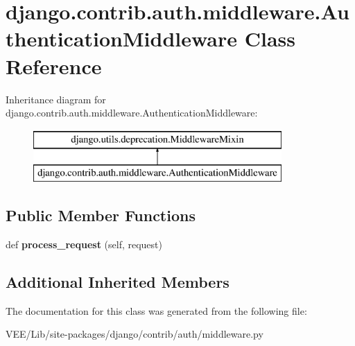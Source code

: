 \hypertarget{classdjango_1_1contrib_1_1auth_1_1middleware_1_1_authentication_middleware}{}\section{django.\+contrib.\+auth.\+middleware.\+Authentication\+Middleware Class Reference}
\label{classdjango_1_1contrib_1_1auth_1_1middleware_1_1_authentication_middleware}
Inheritance diagram for django.\+contrib.\+auth.\+middleware.\+Authentication\+Middleware\+:\begin{figure}[H]
\begin{center}
\leavevmode
\includegraphics[height=2.000000cm]{classdjango_1_1contrib_1_1auth_1_1middleware_1_1_authentication_middleware}
\end{center}
\end{figure}
\subsection*{Public Member Functions}
\begin{DoxyCompactItemize}
\item 
\mbox{\label{classdjango_1_1contrib_1_1auth_1_1middleware_1_1_authentication_middleware_af0999289e5540ef1e2c4b0185d7af288}} 
def {\bfseries process\+\_\+request} (self, request)
\end{DoxyCompactItemize}
\subsection*{Additional Inherited Members}


The documentation for this class was generated from the following file\+:\begin{DoxyCompactItemize}
\item 
V\+E\+E/\+Lib/site-\/packages/django/contrib/auth/middleware.\+py\end{DoxyCompactItemize}
